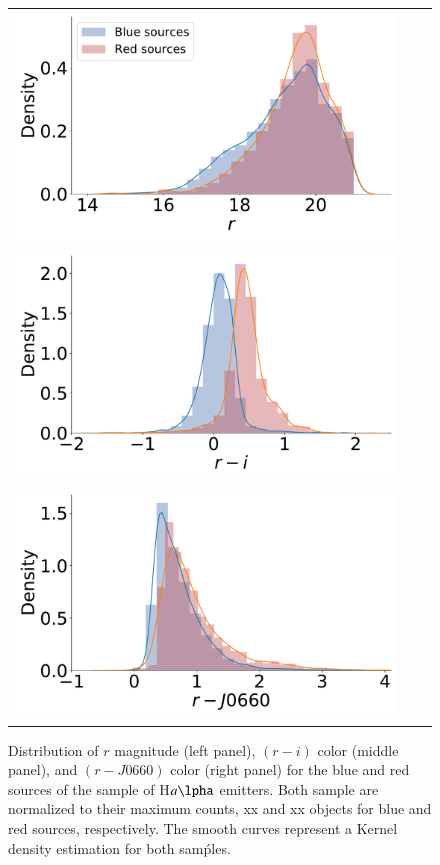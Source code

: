 \documentclass[fleqn,usenatbib]{mnras}
\begin{document}
{\begin{figure}
  \begin{tabular}{l l l}
  \includegraphics[width=\columnwidth]{Figs/distribution_r-group.pdf} \\
    \includegraphics[width=\columnwidth]{Figs/distribution-ri-group.pdf}\\
    \includegraphics[width=\columnwidth]{Figs/distribution-Halpha-group.pdf}
  \end{tabular}
  \caption{Distribution of $r$ magnitude  (left panel), $(r - i)$ color (middle panel), and $(r - J0660)$
    color (right panel) for the blue and red sources of the sample of H$a\lpha$ emitters.
    Both sample are normalized to their maximum counts, xx and xx objects for blue and
    red sources, respectively.   The smooth curves represent a Kernel density estimation for both samṕles.}
    \label{fig:diagram-distri}
\end{figure}

}
\end{document}

